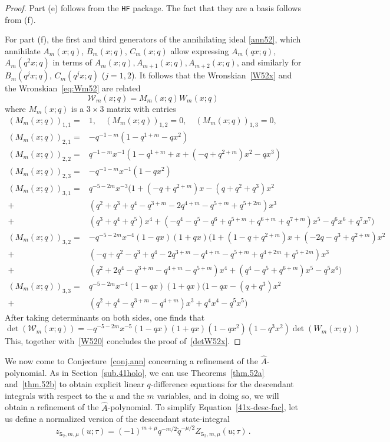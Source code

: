 \documentclass[12pt,reqno]{amsart}
\theoremstyle{definition}
\def\calW{\mathcal W}
\def\tq{\tilde{q}}
\def\Ahat{\widehat{A}}
\def\md{\mathbf}
\def\cW{\mathcal{W}}
\newcommand{\knot}[1]{\md{#1}}
\newcommand{\nn}{\nonumber \\}
\begin{document}
\begin{proof}
  Part (e) follows from the \texttt{HF} package. The
  fact that they are a basis follows from (f).

  For part (f), the first and third generators of the annihilating
  ideal \eqref{ann52}, which annihilate $A_m(x;q)$, $B_m(x;q)$,
  $C_m(x;q)$ allow expressing $A_m(q x;q)$, $A_m(q^2x;q)$ in terms of
  $A_m(x;q), A_{m+1}(x;q), A_{m+2}(x;q)$, and similarly for
  $B_m(q^j x;q)$, $C_m(q^j x;q)$ ($j=1,2$).  It follows that the
  Wronskian~\eqref{W52x} and the Wronskian~\eqref{eq:Wm52} are related
  \begin{equation}
    \cW_m(x;q) = M_m(x;q) W_m(x;q)
    \label{eq:W52xm}
  \end{equation}
  where $M_m(x;q)$ is a $3\times 3$ matrix with entries
  \begin{align}
    (M_m(x;q))_{1,1} =
    &1,\quad (M_m(x;q))_{1,2} =
      0,\quad(M_m(x;q))_{1,3} = 0,\nn
      (M_m(x;q))_{2,1} =
    &-q^{-1-m}(1-q^{1+m}-q x^2)\nn
      (M_m(x;q))_{2,2} =
    &q^{-1-m}x^{-1}(1-q^{1+m}+x+(-q+q^{2+m}) x^2
      -qx^3)\nn
      (M_m(x;q))_{2,3} =
    &-q^{-1-m}x^{-1}(1-qx^2)\nn
      (M_m(x;q))_{3,1} =
    &q^{-5-2m}x^{-3}
      \big(1 + (-q + q^{2+m}) x -(q + q^2 + q^3) x^2 \nn +
    &(q^2 + q^3 + q^4 - q^{3+m} - 2 q^{4+m} - q^{5+m} + q^{5+2m}) x^3 \nn +
    &(q^3 + q^4 + 
      q^5) x^4 + (-q^4 - q^5 - q^6 + q^{5+m} + q^{6+m} + q^{7+m}) x^5 - 
      q^6 x^6 + q^7 x^7\big)\nn
      (M_m(x;q))_{3,2} =
    &-q^{-5-2m}x^{-4}(1-qx)(1+qx)\big(
      1 + (1-q + q^{2+m}) x + (-2 q - q^3 + q^{2+m}) x^2 \nn+
    &(-q + q^2 - q^3 +
      q^4 - 2 q^{3+m} - q^{4+m} - q^{5+m} + q^{4+2m} + q^{5+2m}) x^3\nn+
    &(q^2 + 2 q^4 - q^{3+m} - q^{4+m} - q^{5+m}) x^4
      + (q^4 - q^5 + q^{6+m}) x^5 - q^5 x^6   \big)\nn
      (M_m(x;q))_{3,3} =
    &q^{-5-2m}x^{-4}(1-qx) (1+qx)\big(1-qx-(q+q^3) x^2 \nn+
    &(q^2+q^4-q^{3+m}-q^{4+m})x^3 +q^4 x^4 - q^5 x^5\big)
  \end{align}
  After taking determinants on both sides, one finds that
  \begin{equation}
    \det(\calW_m(x;q)) = -q^{-5-2m} x^{-5}
    (1-qx)(1+qx)(1-qx^2)(1-q^3x^2)
    \det(W_m(x;q))
    \label{detW52xm}
  \end{equation}
  This, together with~\eqref{W520} concludes the proof of~\eqref{detW52x}.
\end{proof}

We now come to Conjecture~\ref{conj.ann} concerning a refinement of
the $\Ahat$-polynomial.  
As in Section~\ref{sub.41holo}, we can use Theorems~\ref{thm.52a}
and~\ref{thm.52b} to obtain explicit linear $q$-difference equations
for the descendant integrals with respect to the $u$ and the $m$
variables, and in doing so, we will obtain a refinement of the
$\Ahat$-polynomial. To simplify Equation~\eqref{41x-desc-fac}, let us define
a normalized version of the descendant state-integral 
\begin{equation}
\label{Z52r}
z_{\knot{5}_2,m,\mu}(u;\tau) =
(-1)^{m+\mu}q^{-m/2}\tq^{-\mu/2}
Z_{\knot{5}_2,m,\mu}(u;\tau) \,.
\end{equation}
\end{document}
